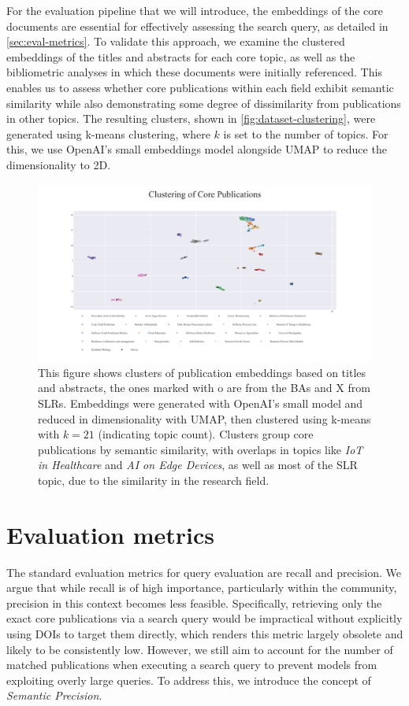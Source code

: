 For the evaluation pipeline that we will introduce, the embeddings of the core documents are essential for effectively assessing the search query, as detailed in \autoref{sec:eval-metrics}. To validate this approach, we examine the clustered embeddings of the titles and abstracts for each core topic, as well as the bibliometric analyses in which these documents were initially referenced. This enables us to assess whether core publications within each field exhibit semantic similarity while also demonstrating some degree of dissimilarity from publications in other topics. The resulting clusters, shown in \autoref{fig:dataset-clustering}, were generated using k-means clustering, where $k$ is set to the number of topics. For this, we use OpenAI's small embeddings model alongside UMAP\autocite{mcinnes2020umap} to reduce the dimensionality to 2D.

\begin{figure}
	\centering	
	\includegraphics[scale=0.6]{pics/umap_clustering.pdf}
	\caption[Core Publications Clustering]{This figure shows clusters of publication embeddings based on titles and abstracts, the ones marked with o are from the BAs and X from SLRs. Embeddings were generated with OpenAI's small model and reduced in dimensionality with UMAP, then clustered using k-means with $k=21$ (indicating topic count). Clusters group core publications by semantic similarity, with overlaps in topics like \textit{IoT in Healthcare} and \textit{AI on Edge Devices}, as well as most of the SLR topic, due to the similarity in the research field.}
	\label{fig:dataset-clustering}
\end{figure}

\section{Evaluation metrics}\label{sec:eval-metrics}
The standard evaluation metrics for query evaluation are recall and precision. We argue that while recall is of high importance, particularly within the community, precision in this context becomes less feasible. Specifically, retrieving only the exact core publications via a search query would be impractical without explicitly using DOIs to target them directly, which renders this metric largely obsolete and likely to be consistently low. However, we still aim to account for the number of matched publications when executing a search query to prevent models from exploiting overly large queries. To address this, we introduce the concept of \textit{Semantic Precision}.

